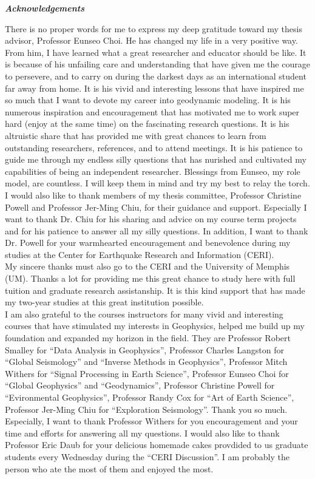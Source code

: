 \begin{center}
\textbf{\textit{\large{Acknowledgements}}}
\end{center}

There is no proper words for me to express my deep gratitude toward my thesis advisor, Professor Eunseo Choi. He has changed my life in a very positive way. From him, I have learned what a great researcher and educator should be like. It is because of his unfailing care and understanding that have given me the courage to persevere, and to carry on during the darkest days as an international student far away from home. It is his vivid and interesting lessons that have inspired me so much that I want to devote my career into geodynamic modeling. It is his numerous inspiration and encouragement that has motivated me to work super hard (enjoy at the same time) on the fascinating research questions. It is his altruistic share that has provided me with great chances to learn from outstanding researchers, references, and to attend meetings. It is his patience to guide me through my endless silly questions that has nurished and cultivated my capabilities of being an independent researcher. Blessings from Eunseo, my role model, are countless. I will keep them in mind and try my best to relay the torch.
\\
I would also like to thank members of my thesis committee, Professor Christine Powell and Professor Jer-Ming Chiu, for their guidance and support. Especially I want to thank Dr. Chiu for his sharing and advice on my course term projects and for his patience to answer all my silly questions. In addition, I want to thank Dr. Powell for your warmhearted encouragement and benevolence during my studies at the Center for Earthquake Research and Information (CERI). 
\\
My sincere thanks must also go to the CERI and the University of Memphis (UM). Thanks a lot for providing me this great chance to study here with full tuition and graduate research assistanship. It is this kind support that has made my two-year studies at this great institution possible. 
\\
I am also grateful to the courses instructors for many vivid and interesting courses that have stimulated my interests in Geophysics, helped me build up my foundation and expanded my horizon in the field. They are Professor Robert Smalley for ``Data Analysis in Geophysics'', Professor Charles Langston for ``Global Seismology'' and ``Inverse Methods in Geophysics'', Professor Mitch Withers for ``Signal Processing in Earth Science'', Professor Eunseo Choi for ``Global Geophysics'' and ``Geodynamics'', Professor Christine Powell for ``Evironmental Geophysics'', Professor Randy Cox for ``Art of Earth Science'', Professor Jer-Ming Chiu for ``Exploration Seismology''. Thank you so much. Especially, I want to thank Professor Withers for you encouragement and your time and efforts for answering all my questions. I would also like to thank Professor Eric Daub for your delicious homemade cakes provdided to us graduate students every Wednesday during the ``CERI Discussion''. I am probably the person who ate the most of them and enjoyed the most.
